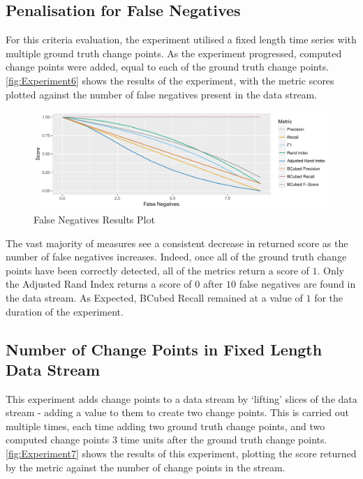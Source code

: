 \documentclass{uvamscse}	%
\begin{document}
\subsection{Penalisation for False Negatives}

For this criteria evaluation, the experiment utilised a fixed length time series with multiple ground truth change points. As the experiment progressed, computed change points were added, equal to each of the ground truth change points. \autoref{fig:Experiment6} shows the results of the experiment, with the metric scores plotted against the number of false negatives present in the data stream.

\begin{figure}[h]
    \includegraphics[width=\textwidth]{figures/Experiment6}
    \caption{False Negatives Results Plot}
    \label{fig:Experiment6}
\end{figure}

The vast majority of measures see a consistent decrease in returned score as the number of false negatives increases. Indeed, once all of the ground truth change points have been correctly detected, all of the metrics return a score of $1$. Only the Adjusted Rand Index returns a score of $0$ after $10$ false negatives are found in the data stream. As Expected, BCubed Recall remained at a value of $1$ for the duration of the experiment.

\subsection{Number of Change Points in Fixed Length Data Stream}

This experiment adds change points to a data stream by `lifting' slices of the data stream - adding a value to them to create two change points. This is carried out multiple times, each time adding two ground truth change points, and two computed change points 3 time units after the ground truth change points. \autoref{fig:Experiment7} shows the results of this experiment, plotting the score returned by the metric against the number of change points in the stream.
\end{document}
